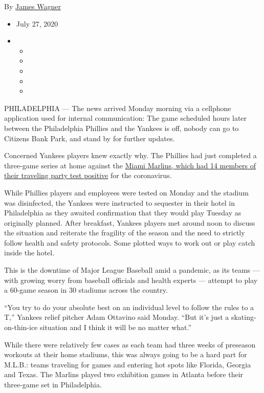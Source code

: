 By \href{https://www.nytimes3xbfgragh.onion/by/james-wagner}{James
Wagner}

\begin{itemize}
\item
  July 27, 2020
\item
  \begin{itemize}
  \item
  \item
  \item
  \item
  \item
  \end{itemize}
\end{itemize}

PHILADELPHIA --- The news arrived Monday morning via a cellphone
application used for internal communication: The game scheduled hours
later between the Philadelphia Phillies and the Yankees is off, nobody
can go to Citizens Bank Park, and stand by for further updates.

Concerned Yankees players knew exactly why. The Phillies had just
completed a three-game series at home against the
\href{https://www.nytimes3xbfgragh.onion/2020/07/27/sports/baseball/marlins-game-canceled.html}{Miami
Marlins, which had 14 members of their traveling party test positive}
for the coronavirus.

While Phillies players and employees were tested on Monday and the
stadium was disinfected, the Yankees were instructed to sequester in
their hotel in Philadelphia as they awaited confirmation that they would
play Tuesday as originally planned. After breakfast, Yankees players met
around noon to discuss the situation and reiterate the fragility of the
season and the need to strictly follow health and safety protocols. Some
plotted ways to work out or play catch inside the hotel.

This is the downtime of Major League Baseball amid a pandemic, as its
teams --- with growing worry from baseball officials and health experts
--- attempt to play a 60-game season in 30 stadiums across the country.

``You try to do your absolute best on an individual level to follow the
rules to a T,'' Yankees relief pitcher Adam Ottavino said Monday. ``But
it's just a skating-on-thin-ice situation and I think it will be no
matter what.''

While there were relatively few cases as each team had three weeks of
preseason workouts at their home stadiums, this was always going to be a
hard part for M.L.B.: teams traveling for games and entering hot spots
like Florida, Georgia and Texas. The Marlins played two exhibition games
in Atlanta before their three-game set in Philadelphia.

